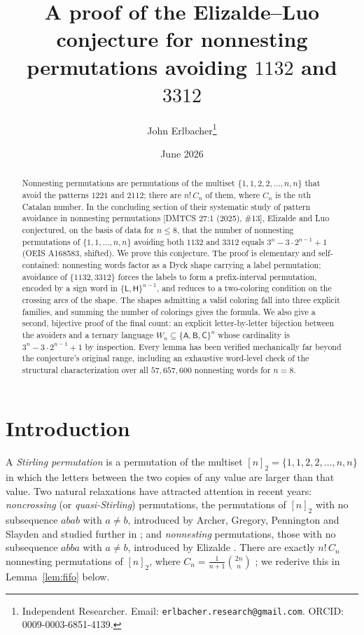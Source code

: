 \documentclass[11pt]{article}
\title{A proof of the Elizalde--Luo conjecture for nonnesting\\ permutations avoiding $1132$ and $3312$}
\author{John Erlbacher\thanks{Independent Researcher. Email: \texttt{erlbacher.research@gmail.com}. ORCID: 0009-0003-6851-4139.}}
\date{June 2026}
\theoremstyle{definition}
\theoremstyle{remark}
\newcommand{\nn}{[n]_2}
\newcommand{\sL}{\mathsf{L}}
\newcommand{\sH}{\mathsf{H}}
\newcommand{\sA}{\mathsf{A}}
\newcommand{\sB}{\mathsf{B}}
\newcommand{\sC}{\mathsf{C}}
\newcommand{\Cat}{C}
\newcommand{\Wn}{W_n}
\begin{document}
\maketitle

\begin{abstract}
Nonnesting permutations are permutations of the multiset
$\{1,1,2,2,\dots,n,n\}$ that avoid the patterns $1221$ and $2112$; there are
$n!\,\Cat_n$ of them, where $\Cat_n$ is the $n$th Catalan number. In the
concluding section of their systematic study of pattern avoidance in
nonnesting permutations [DMTCS 27:1 (2025), \#13], Elizalde and Luo
conjectured, on the basis of data for $n\le 8$, that the number of nonnesting
permutations of $\{1,1,\dots,n,n\}$ avoiding both $1132$ and $3312$ equals
$3^n-3\cdot 2^{n-1}+1$ (OEIS A168583, shifted). We prove this conjecture. The
proof is elementary and self-contained: nonnesting words factor as a Dyck
shape carrying a label permutation; avoidance of $\{1132,3312\}$ forces the
labels to form a prefix-interval permutation, encoded by a sign word in
$\{\sL,\sH\}^{n-1}$, and reduces to a two-coloring condition on the crossing
arcs of the shape. The shapes admitting a valid coloring fall into three
explicit families, and summing the number of colorings gives the formula. We
also give a second, bijective proof of the final count: an explicit
letter-by-letter bijection between the avoiders and a ternary language
$\Wn\subseteq\{\sA,\sB,\sC\}^n$ whose cardinality is
$3^n-3\cdot2^{n-1}+1$ by inspection. Every lemma has been verified
mechanically far beyond the conjecture's original range, including an
exhaustive word-level check of the structural characterization over all
$57{,}657{,}600$ nonnesting words for $n=8$.
\end{abstract}

\section{Introduction}\label{sec:intro}

A \emph{Stirling permutation} \cite{GesselStanley1978} is a permutation of
the multiset $\nn=\{1,1,2,2,\dots,n,n\}$ in which the letters between the two
copies of any value are larger than that value. Two natural relaxations have
attracted attention in recent years: \emph{noncrossing} (or
\emph{quasi-Stirling}) permutations, the permutations of $\nn$ with no
subsequence $abab$ with $a\ne b$, introduced by Archer, Gregory, Pennington
and Slayden \cite{Archer2019} and studied further in
\cite{Elizalde2021}; and \emph{nonnesting} permutations, those with no
subsequence $abba$ with $a\ne b$, introduced by Elizalde \cite{Elizalde2024}.
There are exactly $n!\,\Cat_n$ nonnesting permutations of $\nn$, where
$\Cat_n=\frac{1}{n+1}\binom{2n}{n}$ \cite{Elizalde2024,ElizaldeLuo}; we
rederive this in Lemma~\ref{lem:fifo} below.
\end{document}
